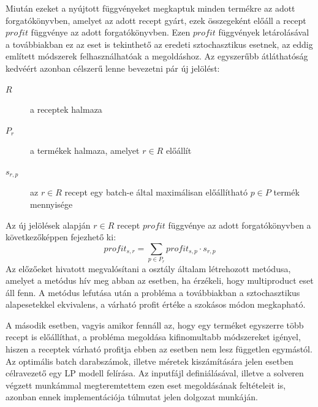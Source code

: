 Miután ezeket a nyújtott függvényeket megkaptuk minden termékre az adott forgatókönyvben, amelyet az adott recept gyárt, ezek összegeként előáll a recept $profit$ függvénye az adott forgatókönyvben.
Ezen $profit$ függvények letárolásával a továbbiakban ez az eset is tekinthető az eredeti sztochasztikus esetnek, az eddig említett módszerek felhasználhatóak a megoldáshoz.
Az egyszerűbb átláthatóság kedvéért azonban célszerű lenne bevezetni pár új jelölést:
\begin{description}
\item[$R$] a receptek halmaza
\item[$P_r$] a termékek halmaza, amelyet $r \in R$ előállít
\item[$s_{r,p}$] az $r \in R$ recept egy batch-e által maximálisan előállítható $p \in P$ termék mennyisége
\end{description}
Az új jelölések alapján $r \in R$ recept $profit$ függvénye az adott forgatókönyvben a következőképpen fejezhető ki:
$$profit_{s,r}=\sum_{p \in P_r} profit_{s,p} \cdot s_{r,p}$$ 
Az előzőeket hivatott megvalósítani a  osztály általam létrehozott  metódusa, amelyet a  metódus hív meg abban az esetben, ha érzékeli, hogy multiproduct eset áll fenn.
A metódus lefutása után a probléma a továbbiakban a sztochasztikus alapesetekkel ekvivalens, a várható profit értéke a szokásos módon megkapható.

A második esetben, vagyis amikor fennáll az, hogy egy terméket egyszerre több recept is előállíthat, a probléma megoldása kifinomultabb módszereket igényel, hiszen a receptek várható profitja ebben az esetben nem lesz független egymástól.
Az optimális batch darabszámok, illetve méretek kiszámítására jelen esetben célravezető egy LP modell felírása. \cite{phd_Hegyhati} Az inputfájl definiálásával, illetve a solveren végzett munkámmal megteremtettem ezen eset megoldásának feltételeit is, azonban ennek implementációja túlmutat jelen dolgozat munkáján.

